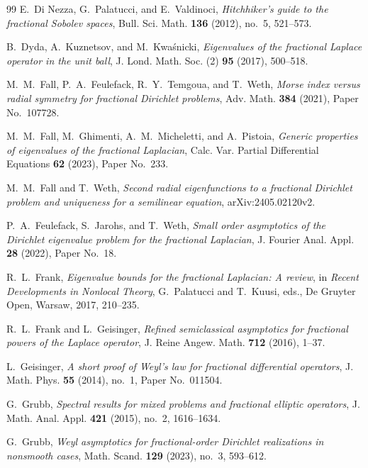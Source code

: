 \documentclass[11pt]{amsart}
\numberwithin{equation}{section}
\theoremstyle{remark}
\begin{document}
\begin{thebibliography}{99}
E.~Di Nezza, G.~Palatucci, and E.~Valdinoci,
\emph{Hitchhiker's guide to the fractional Sobolev spaces},
Bull. Sci. Math. \textbf{136} (2012), no.~5, 521--573.

B.~Dyda, A.~Kuznetsov, and M.~Kwa\'snicki,
\emph{Eigenvalues of the fractional Laplace operator in the unit ball},
J. Lond. Math. Soc. (2) \textbf{95} (2017), 500--518.

M.~M.~Fall, P.~A.~Feulefack, R.~Y.~Temgoua, and T.~Weth,
\emph{Morse index versus radial symmetry for fractional Dirichlet problems},
Adv. Math. \textbf{384} (2021), Paper No.~107728.

M.~M.~Fall, M.~Ghimenti, A.~M.~Micheletti, and A.~Pistoia,
\emph{Generic properties of eigenvalues of the fractional Laplacian},
Calc. Var. Partial Differential Equations \textbf{62} (2023), Paper No.~233.

M.~M.~Fall and T.~Weth,
\emph{Second radial eigenfunctions to a fractional Dirichlet problem and
uniqueness for a semilinear equation},
arXiv:2405.02120v2.

P.~A.~Feulefack, S.~Jarohs, and T.~Weth,
\emph{Small order asymptotics of the Dirichlet eigenvalue problem for the
fractional Laplacian},
J. Fourier Anal. Appl. \textbf{28} (2022), Paper No.~18.

R.~L.~Frank,
\emph{Eigenvalue bounds for the fractional Laplacian: A review},
in \emph{Recent Developments in Nonlocal Theory},
G.~Palatucci and T.~Kuusi,
eds., De Gruyter Open, Warsaw, 2017, 210--235.

R.~L.~Frank and L.~Geisinger,
\emph{Refined semiclassical asymptotics for fractional powers of the
 Laplace operator},
J. Reine Angew. Math. \textbf{712} (2016), 1--37.

L.~Geisinger,
\emph{A short proof of Weyl's law for fractional differential operators},
J. Math. Phys. \textbf{55} (2014), no.~1, Paper No.~011504.

G.~Grubb,
\emph{Spectral results for mixed problems and fractional elliptic operators},
J. Math. Anal. Appl. \textbf{421} (2015), no.~2, 1616--1634.

G.~Grubb,
\emph{Weyl asymptotics for fractional-order Dirichlet realizations in
 nonsmooth cases},
Math. Scand. \textbf{129} (2023), no.~3, 593--612.


\end{thebibliography}
\end{document}
